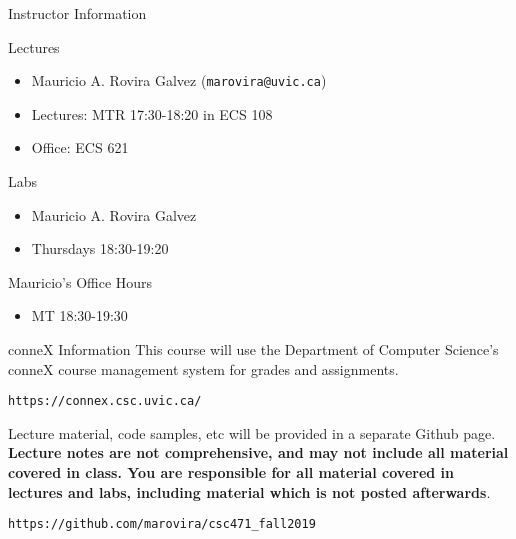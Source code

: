 \documentclass[11pt]{beamer}
\begin{document}
  \begin{frame}{Instructor Information}
    \begin{block}{Lectures}
      \begin{itemize}
        \item Mauricio A. Rovira Galvez (\texttt{marovira@uvic.ca})
        \item Lectures: MTR 17:30-18:20 in ECS 108
        \item Office: ECS 621
      \end{itemize}
    \end{block}

    \begin{block}{Labs}
      \begin{itemize}
        \item Mauricio A. Rovira Galvez
        \item Thursdays 18:30-19:20
      \end{itemize}
    \end{block}

    \begin{block}{Mauricio's Office Hours}
      \begin{itemize}
        \item MT 18:30-19:30
      \end{itemize}
    \end{block}
  \end{frame}

  \begin{frame}{conneX Information}
    This course will use the Department of Computer Science's conneX course
    management system for grades and assignments.
    \begin{center}
      \texttt{https://connex.csc.uvic.ca/}
    \end{center}
    Lecture material, code samples, etc will be provided in a separate Github
    page. \textbf{Lecture notes are not comprehensive, and may not include all
    material covered in class. You are responsible for all material covered in
    lectures and labs, including material which is not posted afterwards}.
    \begin{center}
      \texttt{https://github.com/marovira/csc471\_fall2019}
    \end{center}
  \end{frame}
\end{document}

